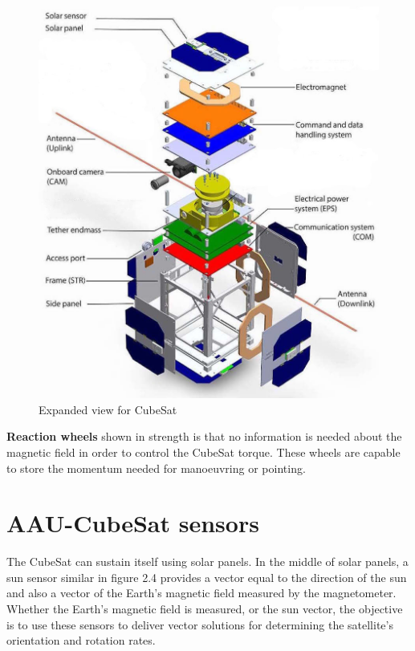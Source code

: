 \begin{table}[H]
\begin{minipage}[b]{0.49\linewidth}
\begin{figure}[H]
			\includegraphics[width=1\linewidth]{figures/cubsat1}
			\caption{Expanded view for CubeSat \cite{view}}
			\label{fig:csat}
		\end{figure}
	\end{minipage}
\end{table}
%
\textbf{Reaction wheels} shown in  strength is that no information is needed about the magnetic field in order to control the CubeSat torque. These wheels are capable to store the momentum needed for manoeuvring or pointing.
\section{AAU-CubeSat sensors}
The CubeSat can sustain itself using solar panels. In the middle of solar panels, a sun sensor similar in figure 2.4 provides a vector equal to the direction of the sun and also a vector of the Earth’s magnetic field measured by the magnetometer. Whether the Earth’s magnetic field is measured, or the sun vector, the objective is to use these sensors to deliver vector solutions for determining the satellite’s orientation and rotation rates.

